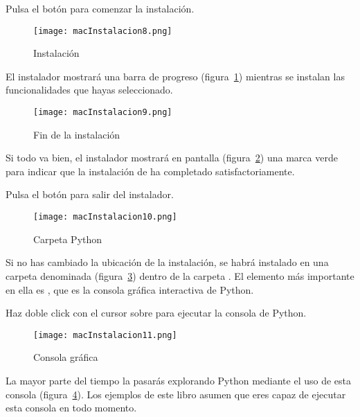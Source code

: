 Pulsa el botón  para comenzar la instalación.

\begin{figure}[!h]
  \begin{center}
\texttt{[image: macInstalacion8.png]}
\caption{Instalación}\label{figm08}
  \end{center}
\end{figure}

El instalador mostrará una barra de progreso (figura~\ref{figm08}) mientras se instalan las funcionalidades que hayas seleccionado.

\begin{figure}[!h]
  \begin{center}
\texttt{[image: macInstalacion9.png]}
\caption{Fin de la instalación}\label{figm09}
  \end{center}
\end{figure}

Si todo va bien, el instalador mostrará en pantalla (figura~\ref{figm09}) una marca verde para indicar que la instalación de ha completado satisfactoriamente.

Pulsa el botón  para salir del instalador.

\begin{figure}[!h]
  \begin{center}
\texttt{[image: macInstalacion10.png]}
\caption{Carpeta Python}\label{figm010}
  \end{center}
\end{figure}

Si no has cambiado la ubicación de la instalación,  se habrá instalado en una carpeta denominada  (figura~\ref{figm010}) dentro de la carpeta \mbox{}. El elemento más importante en ella es , que es la consola gráfica interactiva de Python.

Haz doble click con el cursor sobre  para ejecutar la consola de Python.

\begin{figure}[!h]
  \begin{center}
\texttt{[image: macInstalacion11.png]}
\caption{Consola gráfica}\label{figm011}
  \end{center}
\end{figure}

La mayor parte del tiempo la pasarás explorando Python mediante el uso de esta consola (figura~\ref{figm011}). Los ejemplos de este libro asumen que eres capaz de ejecutar esta consola en todo momento.

